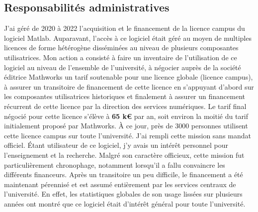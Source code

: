 \documentclass[a4paper,12pt]{article}
\begin{document}


\subsection{Responsabilités administratives}

J’ai géré de 2020 à 2022 l’acquisition et le financement de la licence campus du logiciel Matlab. Auparavant, l’accès à ce logiciel était géré au moyen de multiples licences de forme hétérogène disséminées au niveau de plusieurs composantes utilisatrices. Mon action a consisté à faire un inventaire de l’utilisation de ce logiciel au niveau de l’ensemble de l’université, à négocier auprès de la société éditrice Mathworks un tarif soutenable pour une licence globale (licence campus), à assurer un transitoire de financement de cette licence en s’appuyant d’abord sur les composantes utilisatrices historiques et finalement à assurer un financement récurrent de cette licence par la direction des services numériques. Le tarif final négocié pour cette licence s'élève à \textbf{65 k€} par an, soit environ la moitié du tarif initialement proposé par Mathworks. À ce jour, près de 3000 personnes utilisent cette licence campus sur toute l’université. J’ai rempli cette mission sans mandat officiel. Étant utilisateur de ce logiciel, j’y avais un intérêt personnel pour l’enseignement et la recherche. Malgré son caractère officieux, cette mission fut particulièrement chronophage, notamment lorsqu’il a fallu convaincre les différents financeurs. Après un transitoire un peu difficile, le financement a été maintenant pérennisé et est assumé entièrement par les services centraux de l'université. En effet, les statistiques globales de son usage lissées sur plusieurs années ont montré que ce logiciel était d'intérêt général pour toute l'université.
\end{document}
